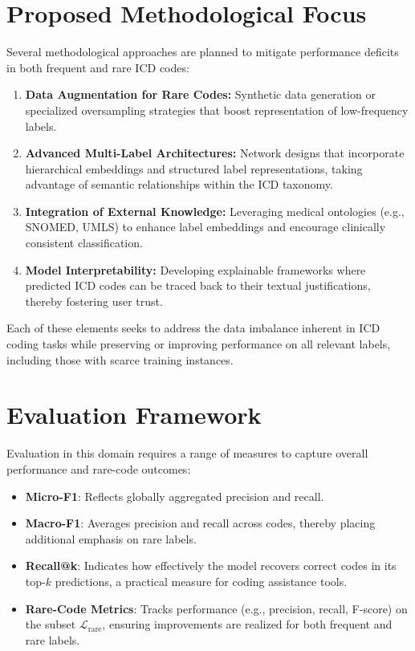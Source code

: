 \section{Proposed Methodological Focus}
Several methodological approaches are planned to mitigate performance deficits in both frequent and rare ICD codes:

\begin{enumerate}
    \item \textbf{Data Augmentation for Rare Codes:} Synthetic data generation or specialized oversampling strategies that boost representation of low-frequency labels.
    \item \textbf{Advanced Multi-Label Architectures:} Network designs that incorporate hierarchical embeddings and structured label representations, taking advantage of semantic relationships within the ICD taxonomy.
    \item \textbf{Integration of External Knowledge:} Leveraging medical ontologies (e.g., SNOMED, UMLS) to enhance label embeddings and encourage clinically consistent classification.
    \item \textbf{Model Interpretability:} Developing explainable frameworks where predicted ICD codes can be traced back to their textual justifications, thereby fostering user trust.
\end{enumerate}

Each of these elements seeks to address the data imbalance inherent in ICD coding tasks while preserving or improving performance on all relevant labels, including those with scarce training instances.

\section{Evaluation Framework}
Evaluation in this domain requires a range of measures to capture overall performance and rare-code outcomes:

\begin{itemize}
    \item \textbf{Micro-F1}: Reflects globally aggregated precision and recall. 
    \item \textbf{Macro-F1}: Averages precision and recall across codes, thereby placing additional emphasis on rare labels.
    \item \textbf{Recall@k}: Indicates how effectively the model recovers correct codes in its top-\(k\) predictions, a practical measure for coding assistance tools.
    \item \textbf{Rare-Code Metrics}: Tracks performance (e.g., precision, recall, F-score) on the subset \(\mathcal{L}_{\mathrm{rare}}\), ensuring improvements are realized for both frequent and rare labels.
\end{itemize}

